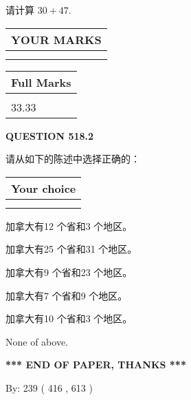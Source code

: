 \documentclass{ctexart}
\begin{document}
  
 
请计算 $ %
30 +  %
47 $.
 

 

 
  
\vspace{0.2in}
  
\noindent\begin{tabular}{|l|}
\hline
 YOUR MARKS  \\
\hline
 \\ 
 \\ 
\hline
\end{tabular}
\hspace{0.05in} \begin{tabular}{|l|}
\hline
 Full Marks  \\
\hline
 \\ 
33.33 \\
\hline
\end{tabular}
{\textbf{\Large{QUESTION
518.2 
}}}
  
  
请从如下的陈述中选择正确的：
  
  
\noindent\hspace{3.0in} \begin{tabular}{|l|}
\hline
Your choice \\
\hline
 \\ 
 \\ 
\hline
\end{tabular}
  
  
 
 
加拿大有12 个省和3 个地区。
 
 
加拿大有25 个省和31 个地区。
 
 
加拿大有9 个省和23 个地区。
 
 
加拿大有7 个省和9 个地区。
 
 
加拿大有10 个省和3 个地区。
 
 
 None of above.
 
 
   
   
 \vspace{0.2in}
 
   
   
   
   
\vspace{1.0in} 
{\textbf{\large{ *** END OF PAPER, THANKS *** }}} 
   
   
\hspace{1.0in} By: 
 239 ( 416 ,  613 )
   
\end{document}
